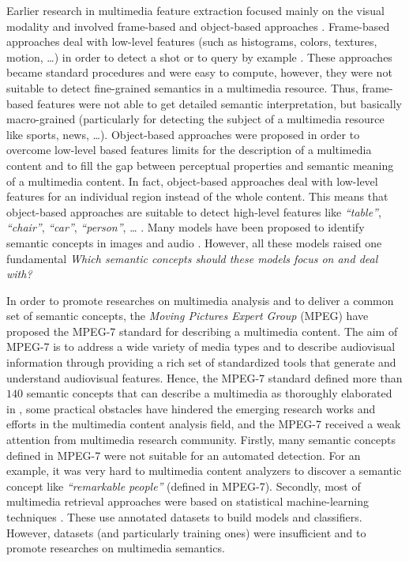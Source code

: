 	Earlier research in multimedia feature extraction focused mainly on the visual modality and involved frame-based 
	and object-based approaches \citep{Puri2000,Deb2004,Snoek2005}. Frame-based approaches deal with low-level features
	(such as histograms, colors, textures, motion, \dots{}) in order to detect a shot or to query by example 
	\citep{Brunelli1999,Antani2002,Kang2003,Smith2003}. These approaches became standard procedures and were 
	easy to compute, however,  they were not suitable to detect fine-grained semantics in a multimedia resource. 
	Thus, frame-based features were not able to get detailed semantic interpretation, but basically macro-grained 
	(particularly for detecting the subject of a multimedia resource like sports, news, \dots{}).
	Object-based approaches were proposed in order to overcome low-level based features limits for the description 
	of a multimedia content and to fill the gap between  perceptual properties and semantic meaning of a multimedia content. 
	In fact, object-based approaches deal with low-level features for an individual region instead of the whole content.
	This means that object-based approaches are suitable to detect high-level features like \emph{``table''}, 
	\emph{``chair''}, \emph{``car''}, \emph{``person''}, \dots{} \citep{Snoek2006,Lew2006,Spyrou2008}. 
	Many models have been proposed to identify semantic concepts in images \citep{Jurie2005,Yang2007,Wang2010} 
	and audio \citep{You2010,Feki2011,Rawat2013}. However, all these models raised one fundamental  
	\emph{Which semantic concepts should these models focus on and deal with?}
	
	In order to promote researches on multimedia analysis and to deliver a common set of semantic concepts, 
	the \textit{Moving Pictures Expert Group} (MPEG) have proposed the MPEG-7 \citep{Salembier2002} standard 
	for describing a multimedia content. The aim of MPEG-7 is to address a wide variety of media types and 
	to describe audiovisual information through providing a rich set of standardized tools that generate 
	and understand audiovisual features. Hence, the MPEG-7 standard defined more than $140$ semantic concepts
	that can describe  a multimedia  as thoroughly elaborated in \citep{Naphade2006}, 
	some  practical obstacles have hindered the emerging research works and efforts in the multimedia content 
	analysis field, and the MPEG-7 received a weak attention from multimedia research community. 
	Firstly, many semantic concepts defined in MPEG-7 were not suitable for an automated detection. 
	For an example, it was very hard to multimedia content analyzers to  discover a semantic concept like 
	\emph{``remarkable people''} (defined in MPEG-7). Secondly, most of multimedia retrieval approaches were 
	based on statistical machine-learning techniques \citep{Deb2004}. These  use annotated datasets to 
	build models and classifiers. However, datasets (and particularly training ones) were insufficient and 
	 to promote researches on multimedia semantics.
	
